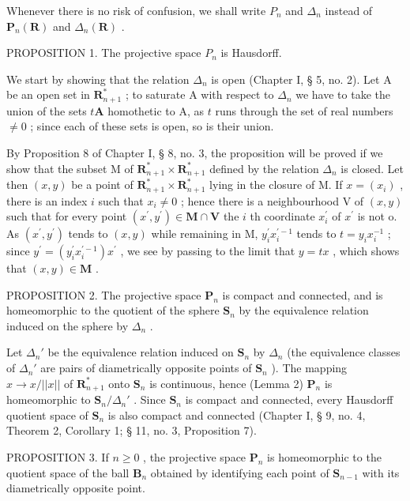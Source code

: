 Whenever there is no risk of confusion, we shall write \(P_{n}\) and \(\Delta_{n}\) instead of \(\mathbf{P}_{n}(\mathbf{R})\) and \(\Delta_{n}(\mathbf{R})\) .

PROPOSITION 1. The projective space \(P_{n}\) is Hausdorff.

We start by showing that the relation \(\Delta_{n}\) is open (Chapter I, § 5, no. 2). Let A be an open set in \(\mathbf{R}_{n+1}^{*}\) ; to saturate A with respect to \(\Delta_{n}\) we have to take the union of the sets \(t\mathbf{A}\) homothetic to A, as \(t\) runs through the set of real numbers \(\neq 0\) ; since each of these sets is open, so is their union.

By Proposition 8 of Chapter I, § 8, no. 3, the proposition will be proved if we show that the subset M of \(\mathbf{R}_{n+1}^{*}\times\mathbf{R}_{n+1}^{*}\) defined by the relation \(\Delta_{n}\) is closed. Let then \((x,y)\) be a point of \(\mathbf{R}_{n+1}^{*}\times\mathbf{R}_{n+1}^{*}\) lying in the closure of M. If \(x=(x_{i})\) , there is an index \(i\) such that \(x_{i}\neq0\) ; hence there is a neighbourhood V of \((x,y)\) such that for every point \((x^{\prime},y^{\prime})\in\mathbf{M}\cap\mathbf{V}\) the \(i\) th coordinate \(x_{i}^{\prime}\) of \(x^{\prime}\) is not o. As \((x^{\prime},y^{\prime})\) tends to \((x,y)\) while remaining in M, \(y_{i}^{\prime}x_{i}^{\prime-1}\) tends to \(t=y_{i}x_{i}^{-1}\) ; since \(y^{\prime}=(y_{i}^{\prime}x_{i}^{\prime-1})x^{\prime}\) , we see by passing to the limit that \(y=tx\) , which shows that \((x,y)\in\mathbf{M}\) .

PROPOSITION 2. The projective space \(\mathbf{P}_{n}\) is compact and connected, and is homeomorphic to the quotient of the sphere \(\mathbf{S}_{n}\) by the equivalence relation induced on the sphere by \(\Delta_{n}\) .

Let \(\Delta_n'\) be the equivalence relation induced on \(\mathbf{S}_n\) by \(\Delta_n\) (the equivalence classes of \(\Delta_n'\) are pairs of diametrically opposite points of \(\mathbf{S}_n\) ). The mapping \(x \to x/||x||\) of \(\mathbf{R}_{n+1}^*\) onto \(\mathbf{S}_n\) is continuous, hence (Lemma 2) \(\mathbf{P}_n\) is homeomorphic to \(\mathbf{S}_n/\Delta_n'\) . Since \(\mathbf{S}_n\) is compact and connected, every Hausdorff quotient space of \(\mathbf{S}_n\) is also compact and connected (Chapter I, § 9, no. 4, Theorem 2, Corollary 1; § 11, no. 3, Proposition 7).

PROPOSITION 3. If \(n \geqslant 0\) , the projective space \(\mathbf{P}_n\) is homeomorphic to the quotient space of the ball \(\mathbf{B}_n\) obtained by identifying each point of \(\mathbf{S}_{n-1}\) with its diametrically opposite point.


